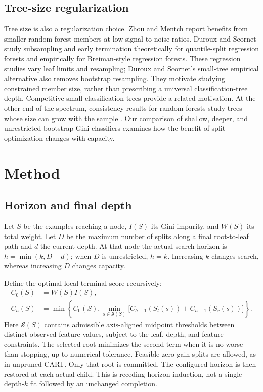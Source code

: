 \documentclass[final,5p,times]{elsarticle}
\begin{document}
\subsection{Tree-size regularization}
Tree size is also a regularization choice. Zhou and Mentch \cite{zhou2023trees} report benefits from smaller random-forest members at low signal-to-noise ratios. Duroux and Scornet \cite{duroux2018impact} study subsampling and early termination theoretically for quantile-split regression forests and empirically for Breiman-style regression forests. These regression studies vary leaf limits and resampling; Duroux and Scornet's small-tree empirical alternative also removes bootstrap resampling. They motivate studying constrained member size, rather than prescribing a universal classification-tree depth. Competitive small classification trees \cite{bertsimas2017optimal} provide a related motivation. At the other end of the spectrum, consistency results for random forests study trees whose size can grow with the sample \cite{scornet2015consistency}. Our comparison of shallow, deeper, and unrestricted bootstrap Gini classifiers examines how the benefit of split optimization changes with capacity.

\section{Method}
\subsection{Horizon and final depth}
Let $S$ be the examples reaching a node, $I(S)$ its Gini impurity, and $W(S)$ its total weight. Let $D$ be the maximum number of splits along a final root-to-leaf path and $d$ the current depth. At that node the actual search horizon is $h=\min(k,D-d)$; when $D$ is unrestricted, $h=k$. Increasing $k$ changes search, whereas increasing $D$ changes capacity.

Define the optimal local terminal score recursively:
\begin{align}
 C_0(S)&=W(S)I(S),\\
 C_h(S)&=\min\left\{C_0(S),\min_{s\in\mathcal S(S)}
 \big[C_{h-1}(S_l(s))+C_{h-1}(S_r(s))\big]\right\}.
 \label{eq:recursion}
\end{align}
Here $\mathcal S(S)$ contains admissible axis-aligned midpoint thresholds between distinct observed feature values, subject to the leaf, depth, and feature constraints. The selected root minimizes the second term when it is no worse than stopping, up to numerical tolerance. Feasible zero-gain splits are allowed, as in unpruned CART. Only that root is committed. The configured horizon is then restored at each actual child. This is receding-horizon induction, not a single depth-$k$ fit followed by an unchanged completion.
\end{document}

